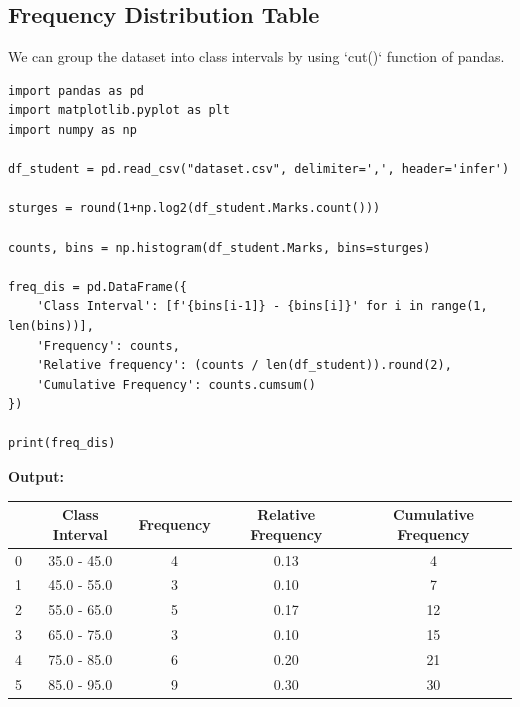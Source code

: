 %  





% 

\subsection{Frequency Distribution Table}
We can group the dataset into class intervals by using `cut()` function of pandas.

\begin{lstlisting}[style=python]
import pandas as pd 
import matplotlib.pyplot as plt 
import numpy as np

df_student = pd.read_csv("dataset.csv", delimiter=',', header='infer')

sturges = round(1+np.log2(df_student.Marks.count()))

counts, bins = np.histogram(df_student.Marks, bins=sturges)

freq_dis = pd.DataFrame({
    'Class Interval': [f'{bins[i-1]} - {bins[i]}' for i in range(1, len(bins))],
    'Frequency': counts,
    'Relative frequency': (counts / len(df_student)).round(2),
    'Cumulative Frequency': counts.cumsum()
})

print(freq_dis)
\end{lstlisting}


\textbf{Output:}

\begin{tabular}{ccccc}
    \toprule
    & \textbf{Class Interval} & \textbf{Frequency} & \textbf{Relative Frequency} & \textbf{Cumulative Frequency} \\
    \midrule
    0 & 35.0 - 45.0  & 4 & 0.13 & 4 \\
    1 & 45.0 - 55.0  & 3 & 0.10 & 7 \\
    2 & 55.0 - 65.0  & 5 & 0.17 & 12 \\
    3 & 65.0 - 75.0  & 3 & 0.10 & 15 \\
    4 & 75.0 - 85.0  & 6 & 0.20 & 21 \\
    5 & 85.0 - 95.0  & 9 & 0.30 & 30 \\

    \bottomrule
\end{tabular}



